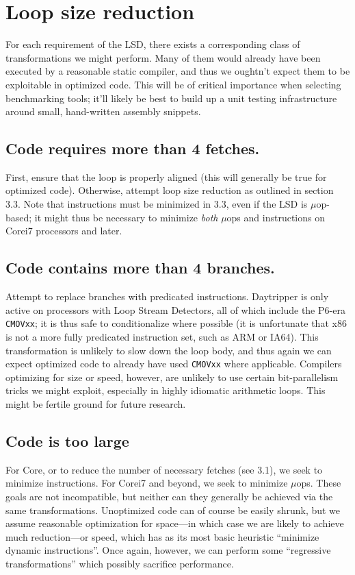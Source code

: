 \documentclass[]{sigplanconf}
\begin{document}
\section{Loop size reduction}

For each requirement of the LSD, there exists a corresponding class of
transformations we might perform. Many of them would already have been
executed by a reasonable static compiler, and thus we oughtn't expect them
to be exploitable in optimized code. This will be of critical importance
when selecting benchmarking tools; it'll likely be best to build up a unit
testing infrastructure around small, hand-written assembly snippets.

\subsection{Code requires more than 4 fetches.} First, ensure that the loop is
properly aligned (this will generally be true for optimized code). Otherwise,
attempt loop size reduction as outlined in section 3.3. Note that instructions
must be minimized in 3.3, even if the LSD is $\mu$op-based; it might thus be
necessary to minimize \textit{both} $\mu$ops and instructions on Core\texttrademark i7
processors and later.

\subsection{Code contains more than 4 branches.} Attempt to replace branches with
predicated instructions. Daytripper is only active on processors with Loop
Stream Detectors, all of which include the P6-era \texttt{CMOVxx}; it is thus
safe to conditionalize where possible (it is unfortunate that x86 is not a more
fully predicated instruction set, such as ARM \cite{seal} or IA64). This transformation is
unlikely to slow down the loop body, and thus again we can expect optimized
code to already have used \texttt{CMOVxx} where applicable. Compilers
optimizing for size or speed, however, are unlikely to use certain
bit-parallelism tricks \cite{warren} we might exploit, especially in highly
idiomatic arithmetic loops. This might be fertile ground for future research.

\subsection{Code is too large} For Core, or to reduce the number
of necessary fetches (see 3.1), we seek to minimize instructions. For Core\texttrademark i7
and beyond, we seek to minimize $\mu$ops. These goals are not incompatible,
but neither can they generally be achieved via the same transformations.
Unoptimized code can of course be easily shrunk, but we assume reasonable
optimization for space---in which case we are likely to achieve much
reduction---or speed, which has as its most basic heuristic ``minimize dynamic
instructions''. Once again, however, we can perform some ``regressive transformations''
which possibly sacrifice performance.
\end{document}
